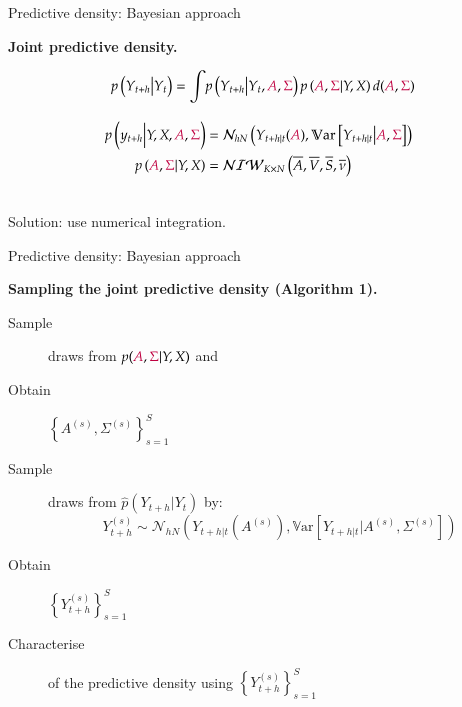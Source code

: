\documentclass[notes,blackandwhite,mathsans,usenames,dvipsnames]{beamer}
\begin{document}
\begin{frame}{Predictive density: Bayesian approach}

\textbf{Joint predictive density.}

\begin{align*} 
p\left(Y_{t+h}\big|Y_t\right) = \int &p\left(Y_{t+h}\big|Y_t, {\color{purple}A},{\color{purple}\Sigma}\right)p\left( {\color{purple}A}, {\color{purple}\Sigma}|Y,X \right) d({\color{purple}A}, {\color{purple}\Sigma}) \\[2ex]
p\left(y_{t+h}\Big|Y,X, {\color{purple}A},{\color{purple}\Sigma}\right) &= \mathcal{N}_{hN}\left(Y_{t+h|t}({\color{purple}A}), \mathbb{V}\text{ar}\left[Y_{t+h|t}\big| {\color{purple}A},{\color{purple}\Sigma}\right]\right)\\
p\left( {\color{purple}A}, {\color{purple}\Sigma}|Y,X \right) &= \mathcal{NIW}_{K\times N}\left( \overline{A},\overline{V}, \overline{S}, \overline{\nu} \right)
\end{align*} 

\\
{\color{purple}Solution: use numerical integration.}
\end{frame}



\begin{frame}{Predictive density: Bayesian approach}

\textbf{Sampling the joint predictive density (Algorithm 1).}

\bigskip
\begin{description}
\item[Sample] {\color{mcxs2}draws from} $p({\color{purple}A}, {\color{purple}\Sigma}|Y,X)$ {\color{mcxs2}and} 
\item[Obtain] $\left\{ A^{(s)}, \Sigma^{(s)}\right\}_{s=1}^{S}$
\item[Sample] {\color{mcxs2}draws from} $\hat{p}\left(Y_{t+h}\big|Y_t\right)$ {\color{mcxs2}by:}
$$ Y_{t+h}^{(s)}\sim \mathcal{N}_{hN}\left(Y_{t+h|t}\left(A^{(s)}\right), \mathbb{V}\text{ar}\left[Y_{t+h|t}\big| A^{(s)},\Sigma^{(s)}\right]\right) $$
\item[Obtain] $\left\{ Y_{t+h}^{(s)}\right\}_{s=1}^{S}$
\item[Characterise] {\color{mcxs2}of the predictive density using} $\left\{ Y_{t+h}^{(s)}\right\}_{s=1}^{S}$
\end{description}

\end{frame}
\end{document}
